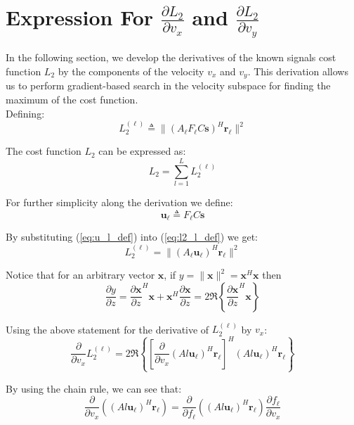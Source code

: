 \section{Expression For $\frac{\partial L_2}{\partial v_x}$ and $\frac{\partial L_2}{\partial v_y}$}
\label{d_L2_dvx_d_vy}
In the following section, we develop the derivatives of the known signals cost function $L_2$ by the components of the velocity $v_x$ and $v_y$. This derivation allows us to perform gradient-based search in the velocity subspace for finding the maximum of the cost function.\\

Defining:
\begin{equation}
\label{eq:l2_l_def}
L_2^{(\ell)} \triangleq \|\left(A_\ell F_\ell C \mathbf{s} \right)^H\mathbf{r_\ell}\|^2
\end{equation}

The cost function $L_2$ can be expressed as:
\begin{equation}
L_2 = \sum_{l=1}^L L_2^{(\ell)}
\end{equation}

For further simplicity along the derivation we define:
\begin{equation}
\label{eq:u_l_def}
\mathbf{u_\ell} \triangleq F_\ell C \mathbf{s}
\end{equation}

By substituting (\ref{eq:u_l_def}) into (\ref{eq:l2_l_def}) we get:
\begin{equation}
L_2^{(\ell)} = \|( A_\ell \mathbf{u_\ell})^H\mathbf{r_\ell}\|^2
\end{equation}

Notice that for an arbitrary vector $\mathbf{x}$, if $y=\|\mathbf{x}\|^2=\mathbf{x}^H\mathbf{x}$ then
$$ \frac{\partial y}{\partial z} = \frac{\partial \mathbf{x}}{\partial z}^H\mathbf{x}+ \mathbf{x}^H\frac{\partial \mathbf{x}}{\partial z}=2 \Re \left\{ \frac{\partial \mathbf{x}}{\partial z}^H\mathbf{x} \right\} $$

Using the above statement for the derivative of $L_2^{(\ell)}$ by $v_x$:
\begin{equation}
\label{eq:three_thirty}
\frac{\partial}{\partial v_x} L_2^{(\ell)}  = 2 \Re
\left\{ 
\left[\frac{\partial}{\partial v_x} (Al \mathbf{u_\ell})^H \mathbf{r_\ell}\right]^H(Al \mathbf{u_\ell})^H \mathbf{r_\ell}
\right\}
\end{equation}

By using the chain rule, we can see that:
\begin{equation}
\label{eq:da_l_d_v_x}
\frac{\partial}{\partial v_x}\left( (Al \mathbf{u_\ell})^H \mathbf{r_\ell}\right) = \frac{\partial}{\partial f_\ell}\left( (Al \mathbf{u_\ell})^H \mathbf{r_\ell}\right) \frac{\partial f_\ell}{\partial v_x}
\end{equation}

